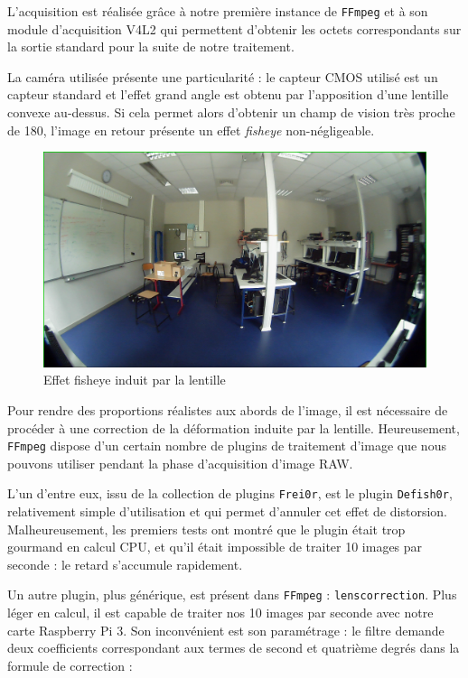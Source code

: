 \documentclass[11pt,a4paper]{article}
\begin{document}
\bigbreak
L'acquisition est réalisée grâce à notre première instance de \texttt{FFmpeg} et à son module d'acquisition V4L2 qui permettent d'obtenir les octets correspondants sur la sortie standard pour la suite de notre traitement.

\bigbreak
La caméra utilisée présente une particularité : le capteur CMOS utilisé est un capteur standard et l'effet grand angle est obtenu par l'apposition d'une lentille convexe au-dessus.
Si cela permet alors d'obtenir un champ de vision très proche de 180\degree, l'image en retour présente un effet \textit{fisheye} non-négligeable.

\bigbreak
\begin{figure}[H]
\begin{center}
\includegraphics[scale=0.2]{images/fisheye.png}
\end{center}
\caption{Effet fisheye induit par la lentille}
\label{}
\end{figure}
\bigbreak

Pour rendre des proportions réalistes aux abords de l'image, il est nécessaire de procéder à une correction de la déformation induite par la lentille.
Heureusement, \texttt{FFmpeg} dispose d'un certain nombre de plugins de traitement d'image que nous pouvons utiliser pendant la phase d'acquisition d'image RAW.

\bigbreak
L'un d'entre eux, issu de la collection de plugins \texttt{Frei0r}, est le plugin \texttt{Defish0r}, relativement simple d'utilisation et qui permet d'annuler cet effet de distorsion.
Malheureusement, les premiers tests ont montré que le plugin était trop gourmand en calcul CPU, et qu'il était impossible de traiter 10 images par seconde : le retard s'accumule rapidement.

\bigbreak
Un autre plugin, plus générique, est présent dans \texttt{FFmpeg} : \texttt{lenscorrection}.
Plus léger en calcul, il est capable de traiter nos 10 images par seconde avec notre carte Raspberry Pi 3.
Son inconvénient est son paramétrage : le filtre demande deux coefficients correspondant aux termes de second et quatrième degrés dans la formule de correction :
\end{document}

